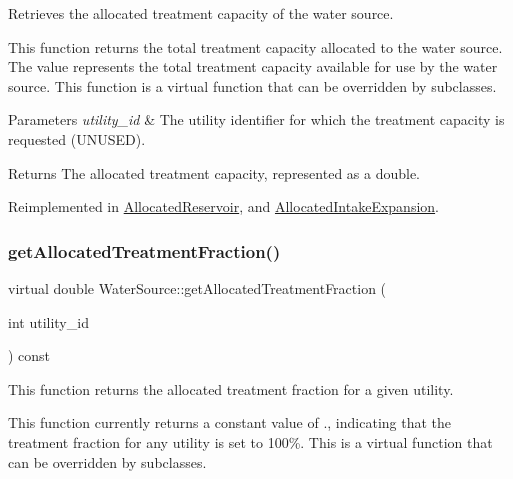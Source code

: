 Retrieves the allocated treatment capacity of the water source. 

This function returns the total treatment capacity allocated to the water source. The value represents the total treatment capacity available for use by the water source. This function is a virtual function that can be overridden by subclasses.


\begin{DoxyParams}{Parameters}
{\em utility\+\_\+id} & The utility identifier for which the treatment capacity is requested (U\+N\+U\+S\+ED).\\
\hline
\end{DoxyParams}
\begin{DoxyReturn}{Returns}
The allocated treatment capacity, represented as a double. 
\end{DoxyReturn}


Reimplemented in \mbox{\hyperlink{classAllocatedReservoir_aba81b93e1aa1154ce411248903fabde6}{Allocated\+Reservoir}}, and \mbox{\hyperlink{classAllocatedIntakeExpansion_a20fb863c5e0bce30c10d1791b037a57a}{Allocated\+Intake\+Expansion}}.

\mbox{\label{classWaterSource_ad943083d8b3bee60ad8d106bba8a5faa}} 
\subsubsection{\texorpdfstring{get\+Allocated\+Treatment\+Fraction()}{getAllocatedTreatmentFraction()}}
{\footnotesize\ttfamily virtual double Water\+Source\+::get\+Allocated\+Treatment\+Fraction (\begin{DoxyParamCaption}\item[{int}]{utility\+\_\+id }\end{DoxyParamCaption}) const\hspace{0.3cm}{\ttfamily [virtual]}}



This function returns the allocated treatment fraction for a given utility. 

This function currently returns a constant value of {.}, indicating that the treatment fraction for any utility is set to 100\%. This is a virtual function that can be overridden by subclasses.


